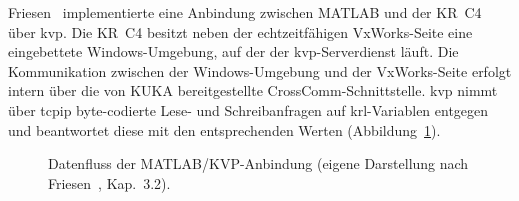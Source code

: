 Friesen~\cite{friesen2021} implementierte eine Anbindung zwischen
MATLAB und der KR~C4 über \ac{kvp}. Die KR~C4 besitzt neben der
echtzeitfähigen VxWorks-Seite eine eingebettete Windows-Umgebung, auf
der der \ac{kvp}-Serverdienst läuft. Die Kommunikation zwischen der
Windows-Umgebung und der VxWorks-Seite erfolgt intern über die von KUKA
bereitgestellte CrossComm-Schnittstelle. \ac{kvp} nimmt über
\ac{tcpip} byte-codierte Lese- und Schreibanfragen auf
\ac{krl}-Variablen entgegen und beantwortet diese mit den
entsprechenden Werten (Abbildung~\ref{fig:kvp_datenfluss}).

\begin{figure}[H]
    \centering
    \caption{Datenfluss der MATLAB/KVP-Anbindung (eigene Darstellung nach
    Friesen~\cite{friesen2021}, Kap.~3.2).}
    \label{fig:kvp_datenfluss}
\end{figure}

